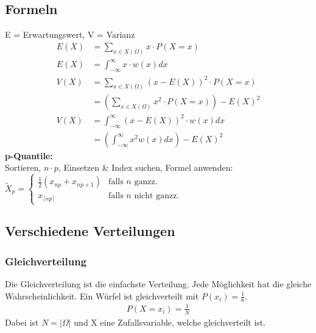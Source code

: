 \documentclass[a4paper, 10pt, landscape]{article}
\begin{document}
\begin{multicols}{5}
\begin{small}
	    \subsection{Formeln}
		    E = Erwartungswert, V = Varianz
		    \begin{align*}
		    	E(X) &= \sum_{x \in X(\Omega)} x \cdot P(X = x)\\
		    	E(X) &= \int_{-\infty}^{\infty} x \cdot w(x) dx\\
		    	V(X) &= \sum_{x \in X(\Omega)} (x - E(X))^2 \cdot P(X = x)\\
			    &= \left(\sum_{x \in X(\Omega)} x^2 \cdot P(X = x)\right) - E(X)^2\\
		    	V(X) &= \int_{-\infty}^{\infty} (x - E(X))^2 \cdot w(x) dx\\
		    	&= \left(\int_{-\infty}^{\infty} x^2 w(x) dx \right) - E(X)^2	 
		    \end{align*}
		    \textbf{p-Quantile:}\\
		    Sortieren, $n\cdot p$, Einsetzen \& Index suchen, Formel anwenden:\\
			$\widetilde{X}_p=
			\begin{cases}
			\frac{1}{2}(x_{np}+x_{np+1}) & \text{falls } n \text{ ganzz.}\\
			x_{\lceil{np}\rceil} & \text{falls } n \text{ nicht ganzz.}
			\end{cases}$
	    \subsection{Verschiedene Verteilungen}
			\subsubsection{Gleichverteilung}	
				Die Gleichverteilung ist die einfachste Verteilung. Jede Möglichkeit hat die gleiche Wahrscheinlichkeit. Ein Würfel ist gleichverteilt mit $P(x_i) = \frac{1}{6}$.\\
				\begin{align*}
					P(X = x_i) = \frac{1}{N}
				\end{align*}
				Dabei ist $N = |\Omega|$ und X eine Zufallsvariable, welche gleichverteilt ist.

\end{small}
\end{multicols}
\end{document}
